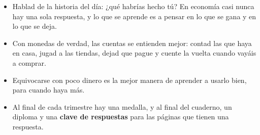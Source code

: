 {\small
\begin{itemize}[leftmargin=6mm, itemsep=1pt, topsep=2pt]
\item Hablad de la historia del día: ¿qué habrías hecho tú? En economía
  casi nunca hay una sola respuesta, y lo que se aprende es a pensar en
  lo que se gana y en lo que se deja.
\item Con monedas de verdad, las cuentas se entienden mejor: contad las
  que haya en casa, jugad a las tiendas, dejad que pague y cuente la
  vuelta cuando vayáis a comprar.
\item Equivocarse con poco dinero es la mejor manera de aprender a
  usarlo bien, para cuando haya más.
\item Al final de cada trimestre hay una medalla, y al final del
  cuaderno, un diploma y una \textbf{clave de respuestas} para las
  páginas que tienen una respuesta.
\end{itemize}}
\newpage
